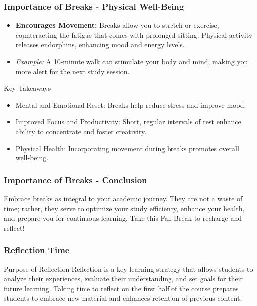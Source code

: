 \documentclass[aspectratio=169]{beamer}
\begin{document}
\begin{frame}[fragile]
    \frametitle{Importance of Breaks - Physical Well-Being}
    \begin{itemize}
        \item \textbf{Encourages Movement:} Breaks allow you to stretch or exercise, counteracting the fatigue that comes with prolonged sitting. Physical activity releases endorphins, enhancing mood and energy levels.
        
        \item \textit{Example:} A 10-minute walk can stimulate your body and mind, making you more alert for the next study session.
    \end{itemize}
    
    \begin{block}{Key Takeaways}
        \begin{itemize}
            \item Mental and Emotional Reset: Breaks help reduce stress and improve mood.
            \item Improved Focus and Productivity: Short, regular intervals of rest enhance ability to concentrate and foster creativity.
            \item Physical Health: Incorporating movement during breaks promotes overall well-being.
        \end{itemize}
    \end{block}
\end{frame}

\begin{frame}[fragile]
    \frametitle{Importance of Breaks - Conclusion}
    Embrace breaks as integral to your academic journey. They are not a waste of time; rather, they serve to optimize your study efficiency, enhance your health, and prepare you for continuous learning. Take this Fall Break to recharge and reflect!
\end{frame}

\begin{frame}[fragile]
    \frametitle{Reflection Time}
    \begin{block}{Purpose of Reflection}
        Reflection is a key learning strategy that allows students to analyze their experiences, evaluate their understanding, and set goals for their future learning. Taking time to reflect on the first half of the course prepares students to embrace new material and enhances retention of previous content.
    \end{block}
\end{frame}
\end{document}
